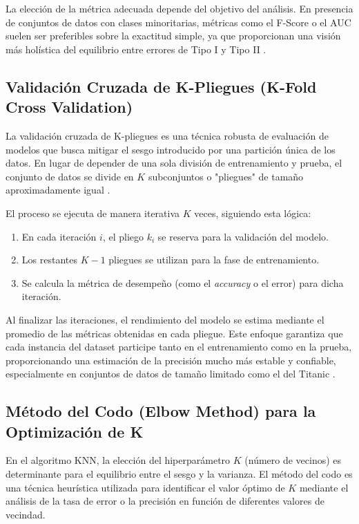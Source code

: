 \documentclass[12pt]{article}
\begin{document}
La elección de la métrica adecuada depende del objetivo del análisis. En presencia de conjuntos de datos con clases minoritarias, métricas como el F-Score o el AUC suelen ser preferibles sobre la exactitud simple, ya que proporcionan una visión más holística del equilibrio entre errores de Tipo I y Tipo II \cite{japkowicz2011evaluating}.

\subsection{Validación Cruzada de K-Pliegues (K-Fold Cross Validation)}
La validación cruzada de K-pliegues es una técnica robusta de evaluación de modelos que busca mitigar el sesgo introducido por una partición única de los datos. En lugar de depender de una sola división de entrenamiento y prueba, el conjunto de datos se divide en $K$ subconjuntos o "pliegues" de tamaño aproximadamente igual \cite{james2013introduction}.

El proceso se ejecuta de manera iterativa $K$ veces, siguiendo esta lógica:
\begin{enumerate}
    \item En cada iteración $i$, el pliego $k_i$ se reserva para la validación del modelo.
    \item Los restantes $K-1$ pliegues se utilizan para la fase de entrenamiento.
    \item Se calcula la métrica de desempeño (como el \textit{accuracy} o el error) para dicha iteración.
\end{enumerate}



Al finalizar las iteraciones, el rendimiento del modelo se estima mediante el promedio de las métricas obtenidas en cada pliegue. Este enfoque garantiza que cada instancia del dataset participe tanto en el entrenamiento como en la prueba, proporcionando una estimación de la precisión mucho más estable y confiable, especialmente en conjuntos de datos de tamaño limitado como el del Titanic \cite{raschka2015python}.

\subsection{Método del Codo (Elbow Method) para la Optimización de K}
En el algoritmo KNN, la elección del hiperparámetro $K$ (número de vecinos) es determinante para el equilibrio entre el sesgo y la varianza. El método del codo es una técnica heurística utilizada para identificar el valor óptimo de $K$ mediante el análisis de la tasa de error o la precisión en función de diferentes valores de vecindad.
\end{document}
